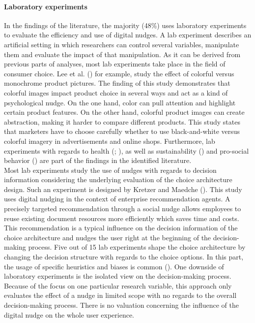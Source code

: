 \paragraph{Laboratory experiments}
In the findings of the literature, the majority (48\%) uses laboratory experiments to evaluate the efficiency and use of digital nudges. A lab experiment describes an artificial setting in which researchers can control several variables, manipulate them and evaluate the impact of that manipulation. As it can be derived from previous parts of analyses, most lab experiments take place in the field of consumer choice. Lee et al. (\citeyear{lee_monochrome_2014}) for example, study the effect of colorful versus monochrome product pictures. The finding of this study demonstrates that colorful images impact product choice in several ways and act as a kind of psychological nudge.
On the one hand, color can pull attention and highlight certain product features. On the other hand, colorful product images can create abstraction, making it harder to compare different products. This study states that marketers have to choose carefully whether to use black-and-white versus colorful imagery in advertisements and online shops.
Furthermore, lab experiments with regards to health (\cite{laran_nonconscious_2018}; \cite{langley_should_2015}), as well as sustainability (\cite{bruns_can_2018}) and pro-social behavior (\cite{zarghamee_nudging_2017}) are part of the findings in the identified literature. 
\\

Most lab experiments study the use of nudges with regards to decision information considering the underlying evaluation of the choice architecture design. Such an experiment is designed by Kretzer and Maedche (\citeyear{kretzer_designing_2018}). This study uses digital nudging in the context of enterprise recommendation agents. A precisely targeted recommendation through a social nudge allows employees to reuse existing document resources more efficiently which saves time and costs. This recommendation is a typical influence on the decision information of the choice architecture and nudges the user right at the beginning of the decision-making process.  %
Five out of 15 lab experiments shape the choice architecture by changing the decision structure with regards to the choice options. In this part, the usage of specific heuristics and biases is common (\cite{tversky_judgment_1974}).
One downside of laboratory experiments is the isolated view on the decision-making process. Because of the focus on one particular research variable, this approach only evaluates the effect of a nudge in limited scope with no regards to the overall decision-making process. There is no valuation concerning the influence of the digital nudge on the whole user experience. %
 
